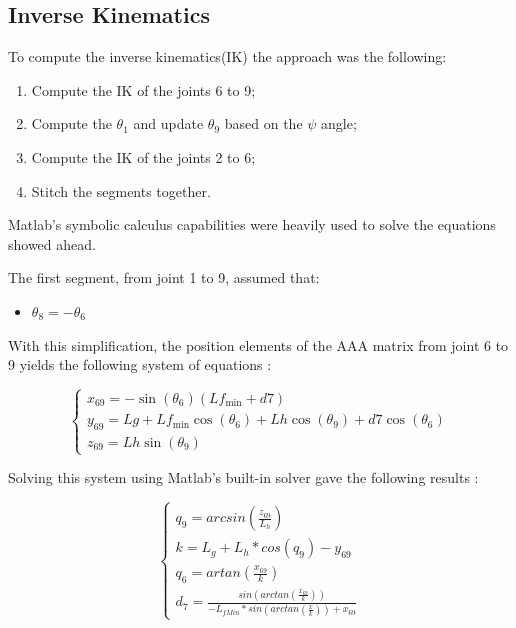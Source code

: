 \documentclass{report}
\begin{document}
\subsection{Inverse Kinematics}

To compute the inverse kinematics(IK) the approach was the following: \begin{enumerate}
    \item Compute the IK of the joints 6 to 9;
    \item Compute the $\theta_1$ and update $\theta_9$ based on the $\psi$ angle;
    \item Compute the IK of the joints 2 to 6;
    \item Stitch the segments together.
\end{enumerate}

Matlab's symbolic calculus capabilities were heavily used to solve the equations
showed ahead.

The first segment, from joint 1 to 9, assumed that:\begin{itemize}
    \item $\theta_8 = -\theta_6$
\end{itemize}

With this simplification, the position elements of the AAA matrix from joint 6
to 9 yields the following system of equations :

\begin{equation}
\begin{cases}
    x_{69} = -\sin(\theta_6)(Lf_{\text{min}} + d7) \\
    y_{69} = Lg + Lf_{\text{min}}\cos(\theta_6) + Lh\cos(\theta_9) + d7\cos(\theta_6) \\
    z_{69} = Lh\sin(\theta_9)
\end{cases}
\end{equation}

Solving this system using Matlab's built-in solver gave the following results :

\begin{equation}
\begin{cases}
    q_9 = arcsin(\frac{z_{69}}{L_h})\\
    k = L_g + L_h*cos(q_9)-y_{69}\\
    q_6 = artan(\frac{x_{69}}{k})\\
    d_7 = \frac{sin(arctan(\frac{x_{69}}{k}))}{-L_{fMin}*sin(arctan(\frac{x}{k}))+x_{69}} 
\end{cases}
\end{equation}
\end{document}
